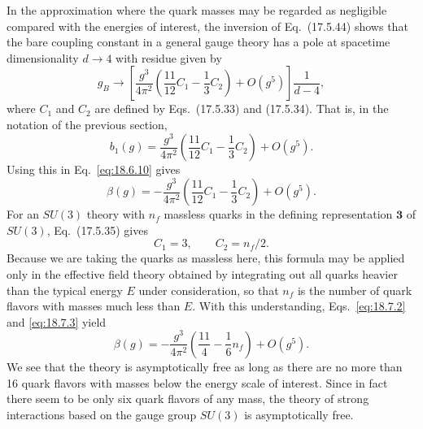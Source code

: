 In the approximation where the quark masses may be regarded as negligible compared with the energies of interest, the inversion of Eq.~(17.5.44) shows that the bare coupling constant in a general gauge theory has a pole at spacetime dimensionality $d\to4$ with residue given by
\[
g_B\longrightarrow
\left[
\frac{g^3}{4\pi^2}\left(\frac{11}{12}C_1-\frac{1}{3}C_2\right)
+O(g^5)
\right]\frac{1}{d-4},
\]
where $C_1$ and $C_2$ are defined by Eqs.~(17.5.33) and (17.5.34). That is, in the notation of the previous section,
\begin{equation}
b_1(g)=\frac{g^3}{4\pi^2}\left(\frac{11}{12}C_1-\frac{1}{3}C_2\right)+O(g^5).
\tag{18.7.1}\label{eq:18.7.1}
\end{equation}
Using this in Eq.~\eqref{eq:18.6.10} gives
\begin{equation}
\beta(g)=-\frac{g^3}{4\pi^2}\left(\frac{11}{12}C_1-\frac{1}{3}C_2\right)+O(g^5).
\tag{18.7.2}\label{eq:18.7.2}
\end{equation}
For an $SU(3)$ theory with $n_f$ massless quarks in the defining representation $\mathbf{3}$ of $SU(3)$, Eq.~(17.5.35) gives
\begin{equation}
C_1=3,\qquad C_2=n_f/2.
\tag{18.7.3}\label{eq:18.7.3}
\end{equation}
Because we are taking the quarks as massless here, this formula may be applied only in the effective field theory obtained by integrating out all quarks heavier than the typical energy $E$ under consideration, so that $n_f$ is the number of quark flavors with masses much less than $E$. With this understanding, Eqs.~\eqref{eq:18.7.2} and \eqref{eq:18.7.3} yield
\begin{equation}
\beta(g)=-\frac{g^3}{4\pi^2}\left(\frac{11}{4}-\frac{1}{6}n_f\right)+O(g^5).
\tag{18.7.4}\label{eq:18.7.4}
\end{equation}
We see that the theory is asymptotically free as long as there are no more than 16 quark flavors with masses below the energy scale of interest. Since in fact there seem to be only six quark flavors of any mass, the theory of strong interactions based on the gauge group $SU(3)$ is asymptotically free.

